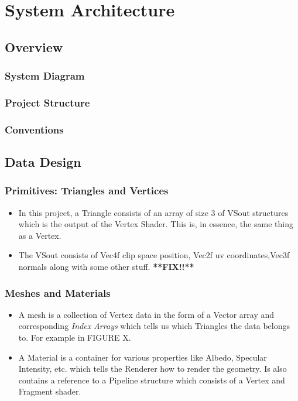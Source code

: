 \documentclass{article}
\begin{document}
\section{System Architecture}

\subsection{Overview}
\subsubsection{System Diagram}
\subsubsection{Project Structure}
\subsubsection{Conventions}

\subsection{Data Design}
\subsubsection{Primitives: Triangles and Vertices}
\begin{itemize}
	\item In this project, a Triangle consists of an array of size 3 of VSout structures which is the output of the Vertex Shader. This is, in essence, the same thing as a Vertex.
	\item The VSout consists of Vec4f clip space position, Vec2f uv coordinates,Vec3f normals along with some other stuff. \textbf{**FIX!!**}
\end{itemize}
\subsubsection{Meshes and Materials}
\begin{itemize}
	\item A mesh is a collection of Vertex data in the form of a Vector array and corresponding \textit{Index Arrays} which tells us which Triangles the data belongs to. For example in FIGURE X. 
	\item A Material is a container for various properties like Albedo, Specular Intensity, etc. which tells the Renderer how to render the geometry. Is also contains a reference to a Pipeline structure which consists of a Vertex and Fragment shader. 
\end{itemize}
\end{document}
